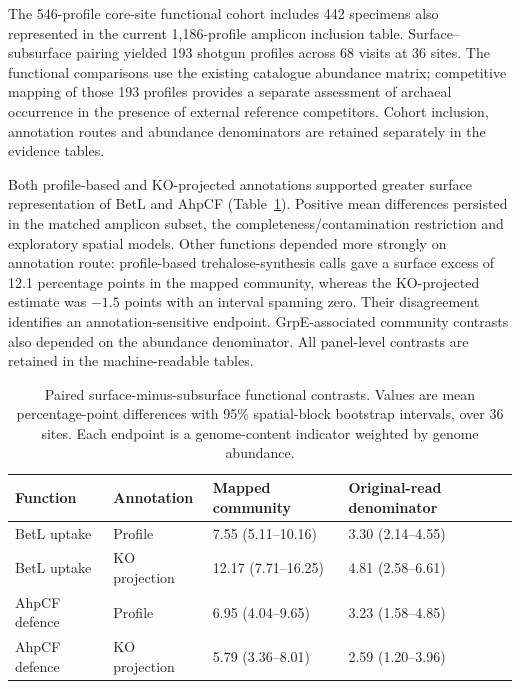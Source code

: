 The 546-profile core-site functional cohort includes 442 specimens also represented in the current 1,186-profile amplicon inclusion table. Surface--subsurface pairing yielded 193 shotgun profiles across 68 visits at 36 sites. The functional comparisons use the existing catalogue abundance matrix; competitive mapping of those 193 profiles provides a separate assessment of archaeal occurrence in the presence of external reference competitors. Cohort inclusion, annotation routes and abundance denominators are retained separately in the evidence tables.

Both profile-based and KO-projected annotations supported greater surface representation of BetL and AhpCF (Table~\ref{tab:integration_traits}). Positive mean differences persisted in the matched amplicon subset, the completeness/contamination restriction and exploratory spatial models. Other functions depended more strongly on annotation route: profile-based trehalose-synthesis calls gave a surface excess of 12.1 percentage points in the mapped community, whereas the KO-projected estimate was $-1.5$ points with an interval spanning zero. Their disagreement identifies an annotation-sensitive endpoint. GrpE-associated community contrasts also depended on the abundance denominator. All panel-level contrasts are retained in the machine-readable tables.

\begin{table}[ht]\centering\small
\caption{Paired surface-minus-subsurface functional contrasts. Values are mean percentage-point differences with 95\% spatial-block bootstrap intervals, over 36 sites. Each endpoint is a genome-content indicator weighted by genome abundance.}\label{tab:integration_traits}
\begin{tabular}{llll}
\toprule
Function & Annotation & Mapped community & Original-read denominator\\
\midrule
BetL uptake & Profile & 7.55 (5.11--10.16) & 3.30 (2.14--4.55)\\
BetL uptake & KO projection & 12.17 (7.71--16.25) & 4.81 (2.58--6.61)\\
AhpCF defence & Profile & 6.95 (4.04--9.65) & 3.23 (1.58--4.85)\\
AhpCF defence & KO projection & 5.79 (3.36--8.01) & 2.59 (1.20--3.96)\\
\bottomrule
\end{tabular}
\end{table}

